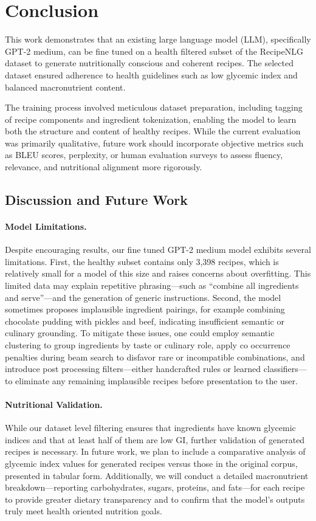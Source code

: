 \section{Conclusion}

This work demonstrates that an existing large language model (LLM), specifically GPT-2 medium, can be fine tuned on a health filtered subset of the RecipeNLG dataset to generate nutritionally conscious and coherent recipes. The selected dataset ensured adherence to health guidelines such as low glycemic index and balanced macronutrient content.

The training process involved meticulous dataset preparation, including tagging of recipe components and ingredient tokenization, enabling the model to learn both the structure and content of healthy recipes. While the current evaluation was primarily qualitative, future work should incorporate objective metrics such as BLEU scores, perplexity, or human evaluation surveys to assess fluency, relevance, and nutritional alignment more rigorously.

\subsection{Discussion and Future Work}

\paragraph{Model Limitations.}
Despite encouraging results, our fine tuned GPT-2 medium model exhibits several limitations. First, the healthy subset contains only 3,398 recipes, which is relatively small for a model of this size and raises concerns about overfitting. This limited data may explain repetitive phrasing—such as “combine all ingredients and serve”—and the generation of generic instructions. Second, the model sometimes proposes implausible ingredient pairings, for example combining chocolate pudding with pickles and beef, indicating insufficient semantic or culinary grounding. To mitigate these issues, one could employ semantic clustering to group ingredients by taste or culinary role, apply co occurrence penalties during beam search to disfavor rare or incompatible combinations, and introduce post processing filters—either handcrafted rules or learned classifiers—to eliminate any remaining implausible recipes before presentation to the user.

\paragraph{Nutritional Validation.}
While our dataset level filtering ensures that ingredients have known glycemic indices and that at least half of them are low GI, further validation of generated recipes is necessary. In future work, we plan to include a comparative analysis of glycemic index values for generated recipes versus those in the original corpus, presented in tabular form. Additionally, we will conduct a detailed macronutrient breakdown—reporting carbohydrates, sugars, proteins, and fats—for each recipe to provide greater dietary transparency and to confirm that the model's outputs truly meet health oriented nutrition goals.

